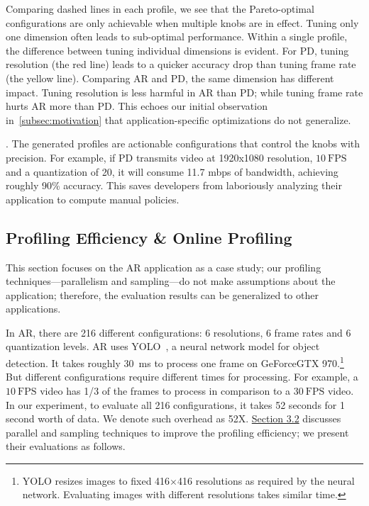  Comparing dashed lines in each
profile, we see that the Pareto-optimal configurations are only achievable when
multiple knobs are in effect. Tuning only one dimension often leads to
sub-optimal performance. Within a single profile, the difference between tuning
individual dimensions is evident. For PD, tuning resolution (the red line) leads
to a quicker accuracy drop than tuning frame rate (the yellow line). Comparing
AR and PD, the same dimension has different impact. Tuning resolution is less
harmful in AR than PD; while tuning frame rate hurts AR more than PD\@. This
echoes our initial observation in~\autoref{subsec:motivation} that
application-specific optimizations do not generalize.

. The generated profiles are actionable
configurations that control the knobs with precision. For example, if PD
transmits video at 1920x1080 resolution, \(10~\text{FPS}\) and a quantization of
20, it will consume 11.7 mbps of bandwidth, achieving roughly 90\%
accuracy. This saves developers from laboriously analyzing their application to
compute manual policies.

\subsection{Profiling Efficiency \& Online Profiling}
\label{sec:online-profiling}

This section focuses on the AR application as a case study; our profiling
techniques---parallelism and sampling---do not make assumptions about the
application; therefore, the evaluation results can be generalized to other
applications.

In AR, there are 216 different configurations: 6 resolutions, 6 frame rates and
6 quantization levels. AR uses YOLO~\cite{redmon2016yolo9000}, a neural network
model for object detection. It takes roughly \SI{30}{\ms} to process one frame
on GeForce\textregistered\space GTX 970.\footnote{YOLO resizes images to fixed
  416$\times$416 resolutions as required by the neural network. Evaluating
  images with different resolutions takes similar time.}  But different
configurations require different times for processing. For example, a
\(10~\text{FPS}\) video has 1/3 of the frames to process in comparison to a
\(30~\text{FPS}\) video.  In our experiment, to evaluate all 216 configurations,
it takes 52 seconds for 1 second worth of data. We denote such overhead as
52X\@. \hyperref[sec:automatic-profiling]{Section 3.2} discusses parallel and
sampling techniques to improve the profiling efficiency; we present their
evaluations as follows.

